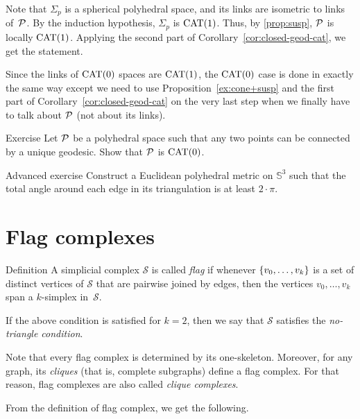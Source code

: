 Note that $\Sigma_p$ is a spherical polyhedral space, 
and its links are isometric to links of~$\mathcal{P}$. 
By the induction hypothesis, $\Sigma_p$ is $\mathrm{CAT}(1)$.
Thus, by \ref{prop:susp}, $\mathcal{P}$ is locally $\mathrm{CAT}(1)$.
Applying the second part of Corollary~\ref{cor:closed-geod-cat},
we get the statement.

Since the links of $\mathrm{CAT}(0)$ spaces are $\mathrm{CAT}(1)$, the $\mathrm{CAT}(0)$ case is done in exactly the same way except we need to use Proposition~\ref{ex:cone+susp} and the first part of Corollary~\ref{cor:closed-geod-cat} on the very last step when we finally have to talk about $\mathcal{P}$ (not about its links).
\qeds

\begin{thm}{Exercise}\label{ex:unique-geod=CAT}
Let $\mathcal{P}$
be a polyhedral space such that any two points can be connected by a unique geodesic.
Show that $\mathcal{P}$ is $\mathrm{CAT}(0)$.
\end{thm}

\begin{thm}{Advanced exercise}\label{ex:S3}
Construct a Euclidean polyhedral metric on $\mathbb{S}^3$
such that the total angle around each edge in its triangulation is at least $2\cdot \pi$.
\end{thm}

\section{Flag complexes}


\begin{thm}{Definition}\label{def:flag}
A simplicial complex $\mathcal{S}$ 
is called \emph{flag} if whenever $\{v_0,\z\ldots,v_k\}$
is a set of distinct vertices of $\mathcal{S}$
that are pairwise joined by edges, then the vertices $v_0,\ldots,v_k$
span a $k$-simplex in~$\mathcal{S}$.

If the above condition is satisfied for $k=2$, 
then we say that $\mathcal{S}$ satisfies 
the \emph{no-triangle condition}.
\end{thm}

Note that every flag complex is determined by its one-skeleton.
Moreover, for any graph, its \emph{cliques} (that is, complete subgraphs) define a flag complex.
For that reason, flag complexes are also called \emph{clique complexes}.

From the definition of flag complex,
we get the following.

